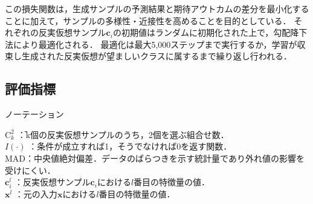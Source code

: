 \documentclass[dvipdfmx]{jreport}
\begin{document}
この損失関数は，生成サンプルの予測結果と期待アウトカムの差分を最小化することに加えて，サンプルの多様性・近接性を高めることを目的としている．
それぞれの反実仮想サンプル$\bm{c}_i$の初期値はランダムに初期化された上で，勾配降下法により最適化される．
最適化は最大5,000ステップまで実行するか，学習が収束し生成された反実仮想が望ましいクラスに属するまで繰り返し行われる．

\subsection{評価指標}
\begin{itembox}[l]{\large{ノーテーション}}
    \begin{tabbing}
        \hspace{15pt} \raisebox{0.5ex}{\tiny $\bullet$} $\text{C}_k^2$ \hspace{7pt} \=：k個の反実仮想サンプルのうち，2個を選ぶ組合せ数． \\[0.5em]
        \hspace{15pt} \raisebox{0.5ex}{\tiny $\bullet$} $\textit{I}(\cdot)$ \>：条件が成立すれば1，そうでなければ0を返す関数．\\[0.5em] 
        \hspace{15pt} \raisebox{0.5ex}{\tiny $\bullet$} MAD\>：中央値絶対偏差．データのばらつきを示す統計量であり外れ値の影響を受けにくい．\\[0.5em]
        \hspace{15pt} \raisebox{0.5ex}{\tiny $\bullet$} $\bm{c}_i^l$ \>：反実仮想サンプル$\bm{c}_i$における$l$番目の特徴量の値．\\[0.5em]
        \hspace{15pt} \raisebox{0.5ex}{\tiny $\bullet$} $\bm{x}^l$ \>：元の入力$\bm{x}$における$l$番目の特徴量の値．        
    \end{tabbing}
\end{itembox}

\end{document}
